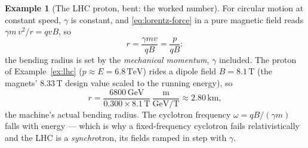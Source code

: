 \documentclass[11pt]{article}
\theoremstyle{plain}
\theoremstyle{definition}
\newtheorem{example}[theorem]{Example}
\theoremstyle{remark}
\begin{document}
\begin{example}[The LHC proton, bent: the worked number]
\label{ex:lhc-bending}
For circular motion at constant speed, $\gamma$ is constant, and
\eqref{eq:lorentz-force} in a pure magnetic field reads
$\gamma m\,v^2/r = qvB$, so
\begin{equation}
  r = \frac{\gamma m v}{qB} = \frac{p}{qB} :
\end{equation}
the bending radius is set by the \emph{mechanical momentum}, $\gamma$
included. The proton of Example~\ref{ex:lhc}
($p \approx E = 6.8\,\mathrm{TeV}$) rides a dipole field
$B = 8.1\,\mathrm{T}$ (the magnets' $8.33\,\mathrm{T}$ design value
scaled to the running energy), so
\begin{equation}
  r = \frac{6800\,\mathrm{GeV}}{0.300 \times 8.1\,\mathrm{T}}
      \,\mathrm{\frac{m}{GeV/T}}
    \approx 2.80\,\mathrm{km},
\end{equation}
the machine's actual bending radius. The cyclotron frequency
$\omega = qB/(\gamma m)$ falls with energy --- which is why a
fixed-frequency cyclotron fails relativistically and the LHC is a
\emph{synchro}tron, its fields ramped in step with $\gamma$.
\end{example}
\end{document}
